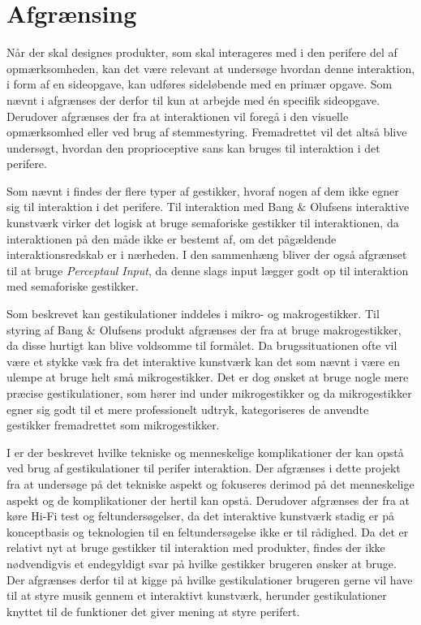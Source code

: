 \section{Afgrænsing}
\label{Afgraensning}
%
Når der skal designes produkter, som skal interageres med i den perifere del af opmærksomheden, kan det være relevant at undersøge hvordan denne interaktion, i form af en sideopgave, kan udføres sideløbende med en primær opgave. Som nævnt i  afgrænses der derfor til kun at arbejde med én specifik sideopgave. Derudover afgrænses der fra at interaktionen vil foregå i den visuelle opmærksomhed eller ved brug af stemmestyring. Fremadrettet vil det altså blive undersøgt, hvordan den proprioceptive sans kan bruges til interaktion i det perifere. 

Som nævnt i  findes der flere typer af gestikker, hvoraf nogen af dem ikke egner sig til interaktion i det perifere. Til interaktion med Bang $\&$ Olufsens interaktive kunstværk virker det logisk at bruge semaforiske gestikker til interaktionen, da interaktionen på den måde ikke er bestemt af, om det pågældende interaktionsredskab er i nærheden. I den sammenhæng bliver der også afgrænset til at bruge \textit{Perceptaul Input}, da denne slags input lægger godt op til interaktion med semaforiske gestikker.

Som beskrevet kan gestikulationer inddeles i mikro- og makrogestikker. Til styring af Bang $\&$ Olufsens produkt afgrænses der fra at bruge makrogestikker, da disse hurtigt kan blive voldsomme til formålet. Da brugssituationen ofte vil være et stykke væk fra det interaktive kunstværk kan det som nævnt i  være en ulempe at bruge helt små mikrogestikker. Det er dog ønsket at bruge nogle mere præcise gestikulationer, som hører ind under mikrogestikker og da mikrogestikker egner sig godt til et mere professionelt udtryk, \parencite[s. 10]{PDF:UsabilityofMicroVsMacroGestures} kategoriseres de anvendte gestikker fremadrettet som mikrogestikker. 

I  er der beskrevet hvilke tekniske og menneskelige komplikationer der kan opstå ved brug af gestikulationer til perifer interaktion. Der afgrænses i dette projekt fra at undersøge på det tekniske aspekt og fokuseres derimod på det menneskelige aspekt og de komplikationer der hertil kan opstå. Derudover afgrænses der fra at køre Hi-Fi test og feltundersøgelser, da det interaktive kunstværk stadig er på konceptbasis og teknologien til en feltundersøgelse ikke er til rådighed. Da det er relativt nyt at bruge gestikker til interaktion med produkter, findes der ikke nødvendigvis et endegyldigt svar på hvilke gestikker brugeren ønsker at bruge. Der afgrænses derfor til at kigge på hvilke gestikulationer brugeren gerne vil have til at styre musik gennem et interaktivt kunstværk, herunder gestikulationer knyttet til de funktioner det giver mening at styre perifert. 

